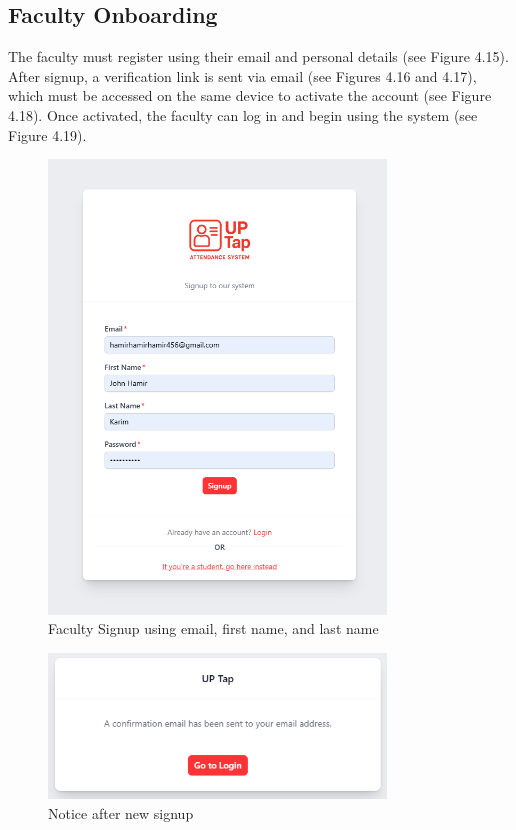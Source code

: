 \subsection{Faculty Onboarding}
The faculty must register using their email and personal details (see Figure 4.15). After signup, a verification link is sent via email (see Figures 4.16 and 4.17), which must be accessed on the same device to activate the account (see Figure 4.18). Once activated, the faculty can log in and begin using the system (see Figure 4.19).
\begin{figure}[h] %
	\centering
	\includegraphics[width=0.8\textwidth]{figures/chapter4/faculty_signup.png} %
	\caption{Faculty Signup using email, first name, and last name}
	\label{fig:faculty_signup}
\end{figure}
\clearpage
\begin{figure}[h] %
	\centering
	\includegraphics[width=0.8\textwidth]{figures/chapter4/faculty_signup_info.png} %
	\caption{Notice after new signup}
	\label{fig:faculty_signup_info}
\end{figure}
